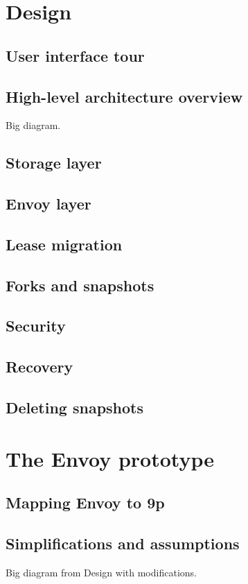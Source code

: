 \documentclass[a4paper,12pt]{article}
\begin{document}
\section{Design}

\subsection{User interface tour}
\subsection{High-level architecture overview}
Big diagram.
\subsection{Storage layer}
\subsection{Envoy layer}
\subsection{Lease migration}
\subsection{Forks and snapshots}
\subsection{Security}
\subsection{Recovery}
\subsection{Deleting snapshots}

\section{The Envoy prototype}

\subsection{Mapping Envoy to 9p}
\subsection{Simplifications and assumptions}
Big diagram from Design with modifications.
\end{document}
